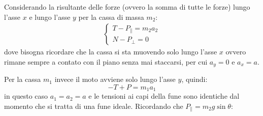 \documentclass{report}
\begin{document}
\begin{enumerate}
Considerando la risultante delle forze (ovvero la somma di tutte le forze) lungo l'asse $x$ e lungo
l'asse $y$ per la cassa di massa $m_2$:
\begin{eqnarray*}
  \begin{cases}
    T-P_\parallel=m_2a_2\\
    N-P_\bot=0
  \end{cases}
\end{eqnarray*}
dove bisogna ricordare che la cassa si sta muovendo solo lungo l'asse $x$ ovvero rimane sempre a contato
con il piano senza mai staccarsi, per cui $a_y=0$ e $a_x=a$.

Per la cassa $m_1$ invece il moto avviene solo lungo l'asse $y$, quindi:
\begin{equation*}
  -T+P=m_1a_1
\end{equation*}
in questo caso $a_1=a_2=a$ e le tensioni ai capi della fune sono identiche dal momento che si tratta
di una fune ideale. Ricordando che $P_\parallel=m_2g\sin\theta$:
\end{enumerate}
\end{document}

